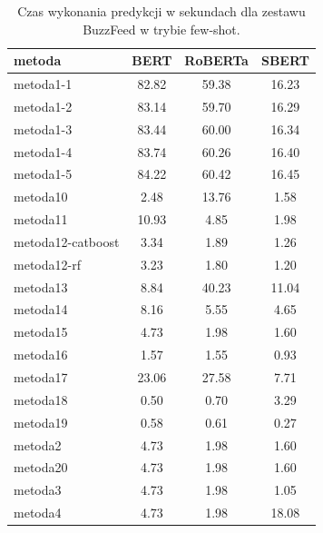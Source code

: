 \begin{table}[H]
	\centering
	\caption{Czas wykonania predykcji w sekundach dla zestawu BuzzFeed w trybie few-shot.}
	\label{tab:execution_time_buzzfeed_few_shot}
	\small
	\begin{tabular}{lccc}
		\toprule
		\textbf{metoda}   & \textbf{BERT} & \textbf{RoBERTa} & \textbf{SBERT} \\
		\midrule
		metoda1-1         & 82.82         & 59.38            & 16.23          \\
		metoda1-2         & 83.14         & 59.70            & 16.29          \\
		metoda1-3         & 83.44         & 60.00            & 16.34          \\
		metoda1-4         & 83.74         & 60.26            & 16.40          \\
		metoda1-5         & 84.22         & 60.42            & 16.45          \\
		metoda10          & 2.48          & 13.76            & 1.58           \\
		metoda11          & 10.93         & 4.85             & 1.98           \\
		metoda12-catboost & 3.34          & 1.89             & 1.26           \\
		metoda12-rf       & 3.23          & 1.80             & 1.20           \\
		metoda13          & 8.84          & 40.23            & 11.04          \\
		metoda14          & 8.16          & 5.55             & 4.65           \\
		metoda15          & 4.73          & 1.98             & 1.60           \\
		metoda16          & 1.57          & 1.55             & 0.93           \\
		metoda17          & 23.06         & 27.58            & 7.71           \\
		metoda18          & 0.50          & 0.70             & 3.29           \\
		metoda19          & 0.58          & 0.61             & 0.27           \\
		metoda2           & 4.73          & 1.98             & 1.60           \\
		metoda20          & 4.73          & 1.98             & 1.60           \\
		metoda3           & 4.73          & 1.98             & 1.05           \\
		metoda4           & 4.73          & 1.98             & 18.08          \\

\end{tabular}
\end{table}
